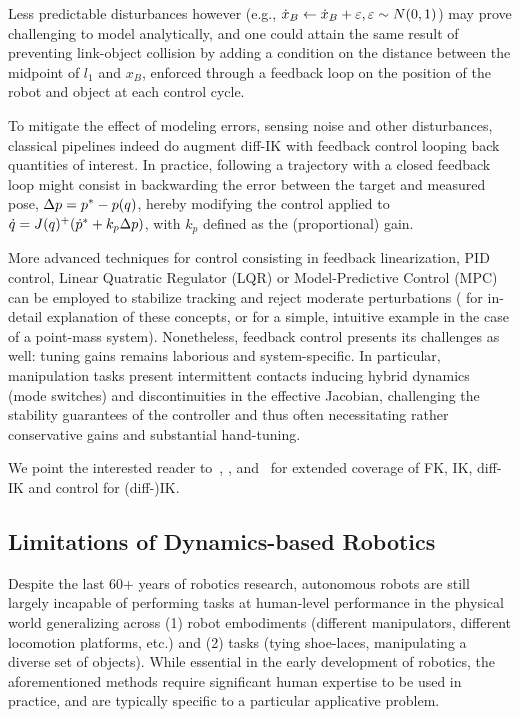 Less predictable disturbances however (e.g., \( \dot x_B \leftarrow \dot x_B + {\varepsilon}, {\varepsilon} \sim N(0,1) \)) may prove challenging to model analytically, and one could attain the same result of preventing link-object collision by adding a condition on the distance between the midpoint of \( l_1 \) and \( x_B \), enforced through a feedback loop on the position of the robot and object at each control cycle.

To mitigate the effect of modeling errors, sensing noise and other disturbances, classical pipelines indeed do augment diff-IK with feedback control looping back quantities of interest.
In practice, following a trajectory with a closed feedback loop might consist in backwarding the error between the target and measured pose, \( \Delta p = p^* - p(q) \), hereby modifying the control applied to \( \dot q = J(q)^+ (\dot {p}^* + k_p \Delta p ) \), with \( k_p \) defined as the (proportional) gain.

More advanced techniques for control consisting in feedback linearization, PID control, Linear Quatratic Regulator (LQR) or Model-Predictive Control (MPC) can be employed to stabilize tracking and reject moderate perturbations (\citep[Chapter~8]{sicilianoSpringerHandbookRobotics2016} for in-detail explanation of these concepts, or \citep[Chapter~8]{tedrakeRoboticManipulationPerception} for a simple, intuitive example in the case of a point-mass system).
Nonetheless, feedback control presents its challenges as well: tuning gains remains laborious and system-specific. 
In particular, manipulation tasks present intermittent contacts inducing hybrid dynamics (mode switches) and discontinuities in the effective Jacobian, challenging the stability guarantees of the controller and thus often necessitating rather conservative gains and substantial hand-tuning.

We point the interested reader to~\citet[Chapter~2,7,8]{sicilianoSpringerHandbookRobotics2016}, \citet[Chapter~6,11]{lynchModernRoboticsMechanics2017}, and~\citet[Chapter~3,8]{tedrakeRoboticManipulationPerception} for extended coverage of FK, IK, diff-IK and control for (diff-)IK.

\subsection{Limitations of Dynamics-based Robotics}
Despite the last 60+ years of robotics research, autonomous robots are still largely incapable of performing tasks at human-level performance in the physical world generalizing across (1) robot embodiments (different manipulators, different locomotion platforms, etc.) and (2) tasks (tying shoe-laces, manipulating a diverse set of objects).
While essential in the early development of robotics, the aforementioned methods require significant human expertise to be used in practice, and are typically specific to a particular applicative problem.

